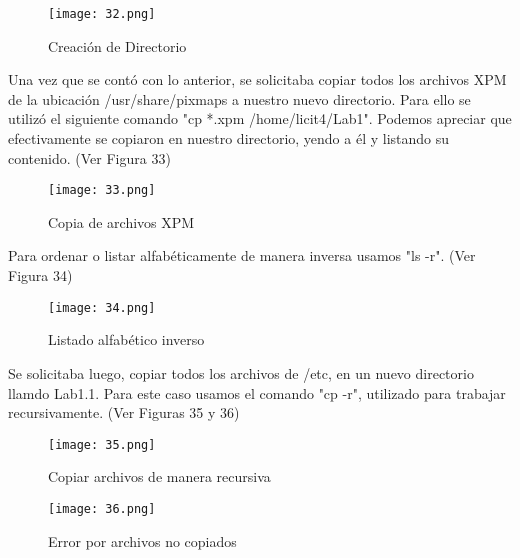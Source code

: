 \documentclass[
  letterpaper, 
  maincolor=black,
  sectioncolor=black!90,
  subsectioncolor=black!70,
  itemtextcolor=black!40,
]{fortysecondscv}
\begin{document}
\begin{center}
    \begin{figure}[H]
    \centering
    \texttt{[image: 32.png]}
    \caption{Creación de Directorio}
    \label{fig:10.png}
    \end{figure}
\end{center}

{Una vez que se contó con lo anterior, se solicitaba copiar todos los archivos XPM de la ubicación /usr/share/pixmaps a nuestro nuevo directorio. Para ello se utilizó el siguiente comando "cp *.xpm /home/licit4/Lab1". Podemos apreciar que efectivamente se copiaron en nuestro directorio, yendo a él y listando su contenido. (Ver Figura 33)}

\begin{center}
    \begin{figure}[H]
    \centering
    \texttt{[image: 33.png]}
    \caption{Copia de archivos XPM}
    \label{fig:10.png}
    \end{figure}
\end{center}

{Para ordenar o listar alfabéticamente de manera inversa usamos "ls -r". (Ver Figura 34)}

\begin{center}
    \begin{figure}[H]
    \centering
    \texttt{[image: 34.png]}
    \caption{Listado alfabético inverso}
    \label{fig:10.png}
    \end{figure}
\end{center}

{Se solicitaba luego, copiar todos los archivos de /etc, en un nuevo directorio llamdo Lab1.1. Para este caso usamos el comando "cp -r", utilizado para trabajar recursivamente. (Ver Figuras 35 y 36)}

\begin{center}
    \begin{figure}[H]
    \centering
    \texttt{[image: 35.png]}
    \caption{Copiar archivos de manera recursiva}
    \label{fig:10.png}
    \end{figure}
\end{center}

\begin{center}
    \begin{figure}[H]
    \centering
    \texttt{[image: 36.png]}
    \caption{Error por archivos no copiados}
    \label{fig:10.png}
    \end{figure}
\end{center}
\end{document}
